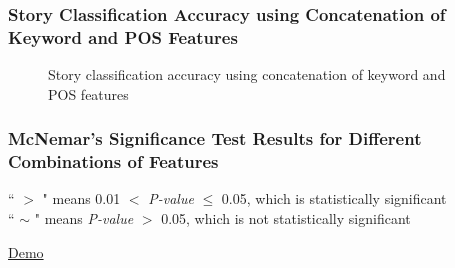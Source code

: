 \documentclass{beamer}
\begin{document}

\begin{frame}
\frametitle{Story Classification Accuracy using Concatenation of Keyword and POS Features}

\begin{figure}
\centering
{}
\centering
\caption{Story classification accuracy using concatenation of keyword and POS features}
\label{Figure: Story Accuracy set 2}
\end{figure} 


\end{frame}


\begin{frame}
\frametitle{McNemar's Significance Test Results for Different Combinations of Features}

\begin{table}
\renewcommand{\arraystretch}{1}
\caption {Statistical significance test results for different combination of features \label{Table: Mcnemar result of significance test}}
\begin{threeparttable} 
	\begin{tablenotes} 
 `` $>$ " means 0.01 $<$ \textit{P-value} $\leq$ 0.05, which is statistically significant \\ `` $\sim$ " means \textit{P-value} $>$ 0.05, which is not statistically significant 
    \end{tablenotes}
  \end{threeparttable}

\end{table}	
\href{run:Mcnemar.pdf}{Demo}
\end{frame}
\end{document}
